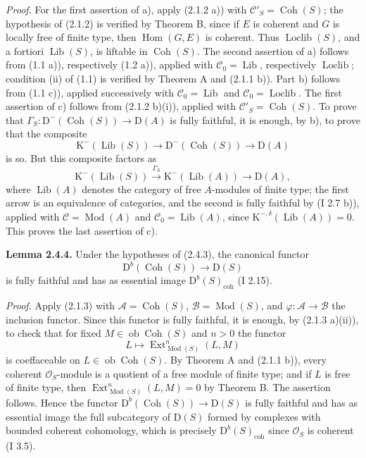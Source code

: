 \documentclass[11pt]{article}
\providecommand{\Mod}{\operatorname{Mod}}
\providecommand{\Lib}{\operatorname{Lib}}
\providecommand{\Loclib}{\operatorname{Loclib}}
\providecommand{\Coh}{\operatorname{Coh}}
\providecommand{\Ext}{\operatorname{Ext}}
\providecommand{\Ob}{\operatorname{ob}}
\providecommand{\coh}{\operatorname{coh}}
\begin{document}
\emph{Proof.} For the first assertion of a), apply (2.1.2 a)) with $\mathcal C'_S=\Coh(S)$; the hypothesis of (2.1.2) is verified by Theorem B, since if $E$ is coherent and $G$ is locally free of finite type, then $\operatorname{Hom}(G,E)$ is coherent. Thus $\Loclib(S)$, and a fortiori $\Lib(S)$, is liftable in $\Coh(S)$. The second assertion of a) follows from (1.1 a)), respectively (1.2 a)), applied with $\mathcal C_0=\Lib$, respectively $\Loclib$; condition (ii) of (1.1) is verified by Theorem A and (2.1.1 b)). Part b) follows from (1.1 c)), applied successively with $\mathcal C_0=\Lib$ and $\mathcal C_0=\Loclib$. The first assertion of c) follows from (2.1.2 b)(i)), applied with $\mathcal C'_S=\Coh(S)$. To prove that $\Gamma_S:\mathrm D^{-}(\Coh(S))\to\mathrm D(A)$ is fully faithful, it is enough, by b), to prove that the composite
\[
\mathrm K^{-}(\Lib(S))\longrightarrow\mathrm D^{-}(\Coh(S))\longrightarrow\mathrm D(A)
\]
is so. But this composite factors as
\[
\mathrm K^{-}(\Lib(S))\xrightarrow{\Gamma_S}\mathrm K^{-}(\Lib(A))\longrightarrow\mathrm D(A),
\]
where $\Lib(A)$ denotes the category of free $A$-modules of finite type; the first arrow is an equivalence of categories, and the second is fully faithful by (I 2.7 b)), applied with $\mathcal C=\Mod(A)$ and $\mathcal C_0=\Lib(A)$, since $\mathrm K^{-,\delta}(\Lib(A))=0$. This proves the last assertion of c).

\textbf{Lemma 2.4.4.} Under the hypotheses of (2.4.3), the canonical functor
\[
\mathrm D^b(\Coh(S))\longrightarrow\mathrm D(S)
\]
is fully faithful and has as essential image $\mathrm D^b(S)_{\coh}$ (I 2.15).

\emph{Proof.} Apply (2.1.3) with $\mathcal A=\Coh(S)$, $\mathcal B=\Mod(S)$, and $\varphi:\mathcal A\to\mathcal B$ the inclusion functor. Since this functor is fully faithful, it is enough, by (2.1.3 a)(ii)), to check that for fixed $M\in\Ob\Coh(S)$ and $n>0$ the functor
\[
L\longmapsto \Ext^n_{\Mod(S)}(L,M)
\]
is coeffaceable on $L\in\Ob\Coh(S)$. By Theorem A and (2.1.1 b)), every coherent $\mathcal O_S$-module is a quotient of a free module of finite type; and if $L$ is free of finite type, then $\Ext^n_{\Mod(S)}(L,M)=0$ by Theorem B. The assertion follows. Hence the functor $\mathrm D^b(\Coh(S))\to\mathrm D(S)$ is fully faithful and has as essential image the full subcategory of $\mathrm D(S)$ formed by complexes with bounded coherent cohomology, which is precisely $\mathrm D^b(S)_{\coh}$ since $\mathcal O_S$ is coherent (I 3.5).
\end{document}
